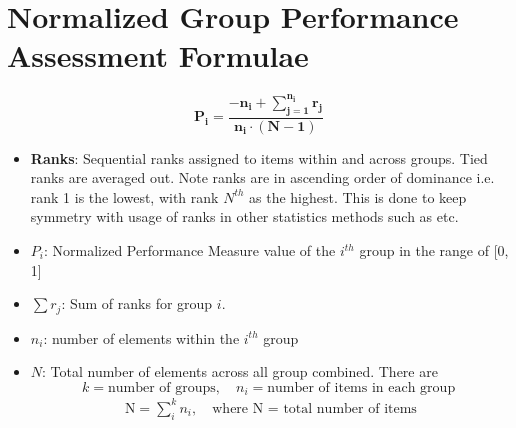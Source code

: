 \documentclass[man,floatsintext]{apa7}
\begin{document}
\section{Normalized Group Performance Assessment Formulae}


\begin{equation}
\boxed{
\mathbf{
P_i = \frac{-n_i +  \sum\limits_{j=1}^{n_i} r_j}{n_i \cdot (N - 1)}}
}
\end{equation}
   
\begin{itemize}
    \item \textbf{Ranks}: Sequential ranks assigned to items within and across groups. Tied ranks are averaged out. Note ranks are in ascending order of dominance i.e. rank 1 is the lowest, with rank $N^{th}$ as the highest. This is done to keep symmetry with usage of ranks in other statistics methods such as \cite{mann1947test} etc.
    \item \textbf{$P_i$}: Normalized Performance Measure value of the $i^{th}$ group in the range of [0, 1]
    \item \textbf{$\sum r_j$}: Sum of ranks for group $i$.
    \item \textbf{$n_i$}: number of elements within the $i^{th}$ group
    \item \textbf{$N$}: Total number of elements across all group combined. \hfill \break
    There are \[k = \text{number of groups}, \quad n_i = \text{number of items in each group }\]
    \begin{align}
        \text{N} = \sum\limits_i^k n_i, \quad \text{where N = total number of items}
    \end{align}

\end{itemize}
\end{document}
